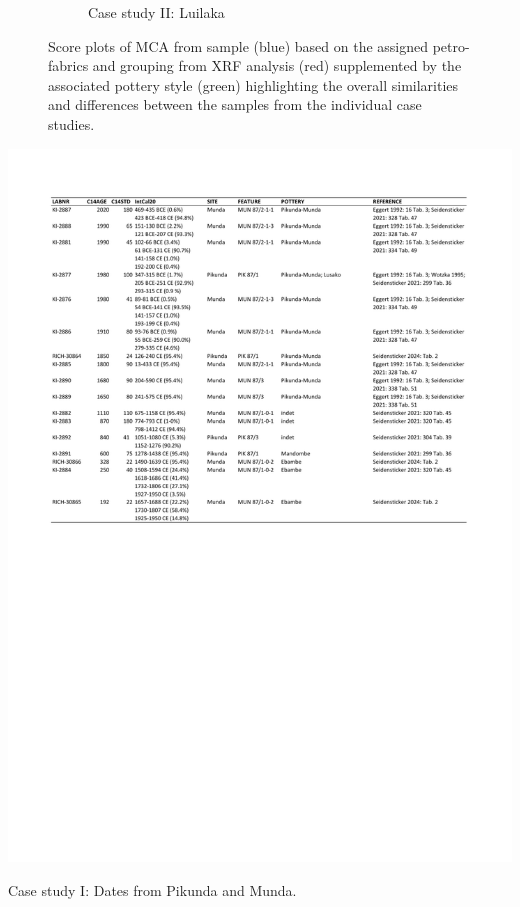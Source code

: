 \documentclass[a4paper]{article}
\begin{document}
\begin{figure}[H]
\begin{subfigure}[t]{.66\textwidth}
		\caption{Case study II: Luilaka}
		\label{fig:synthesis.luilaka}
	\end{subfigure}
	\caption{Score plots of MCA from sample (blue) based on the assigned petro-fabrics and grouping from XRF analysis (red) supplemented by the associated pottery style (green) highlighting the overall similarities and differences between the samples from the individual case studies.}
	\label{fig:synthesis}
\end{figure}

\begin{table}[p]
	\begin{subtable}[t]{\textwidth}
		\centering
		\includegraphics[width=\textwidth]{Tab_14C_nwCB.pdf}
		\caption{Case study I: Dates from Pikunda and Munda.}
		\label{tbl:c14_pik}
	\end{subtable}
	

\end{table}
\end{document}
